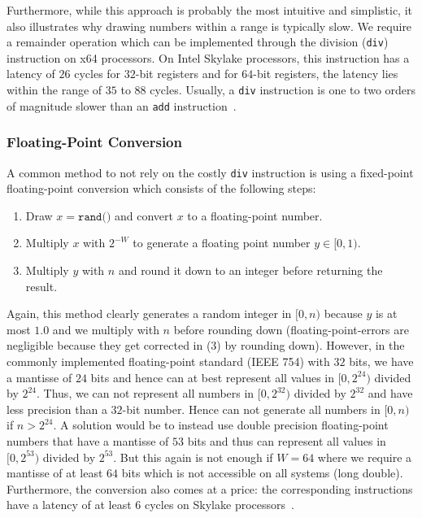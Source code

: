 \documentclass[a4paper, UKenglish, cleveref, autoref, thm-restate]{lipics-v2021}
\begin{document}
Furthermore, while this approach is probably the most intuitive and simplistic, it also illustrates why drawing numbers within a range is typically slow.
We require a remainder operation which can be implemented through the division (\texttt{div}) instruction on x64 processors.
On Intel Skylake processors, this instruction has a latency of $26$ cycles for $32$-bit registers and for $64$-bit registers, the latency lies within the range of $35$ to $88$ cycles.
Usually, a \texttt{div} instruction is one to two orders of magnitude slower than an \texttt{add} instruction~\cite{Instructions}.


\subsubsection{Floating-Point Conversion}\label{sec:2.1.2}
A common method to not rely on the costly \texttt{div} instruction is using a fixed-point floating-point conversion which consists of the following steps:
\begin{enumerate}
    \item Draw $x = \texttt{rand()}$ and convert $x$ to a floating-point number.
    \item Multiply $x$ with $2^{-W}$ to generate a floating point number $y \in [0,1)$.
    \item Multiply $y$ with $n$ and round it down to an integer before returning the result.
\end{enumerate}

Again, this method clearly generates a random integer in $[0,n)$ because $y$ is at most $1.0$ and we multiply with $n$ before rounding down (floating-point-errors are negligible because they get corrected in (3) by rounding down).
However, in the commonly implemented floating-point standard (IEEE 754) with $32$ bits, we have a mantisse of $24$ bits and hence can at best represent all values in $[0,2^{24})$ divided by $2^{24}$.
Thus, we can not represent all numbers in $[0,2^{32})$ divided by $2^{32}$ and have less precision than a $32$-bit number.
Hence can not generate all numbers in $[0,n)$ if $n > 2^{24}$.
A solution would be to instead use double precision floating-point numbers that have a mantisse of $53$ bits and thus can represent all values in $[0,2^{53})$ divided by $2^{53}$.
But this again is not enough if $W = 64$ where we require a mantisse of at least $64$ bits which is not accessible on all systems (long double).
Furthermore, the conversion also comes at a price: the corresponding instructions have a latency of at least $6$ cycles on Skylake processors~\cite{Instructions}.
\end{document}
